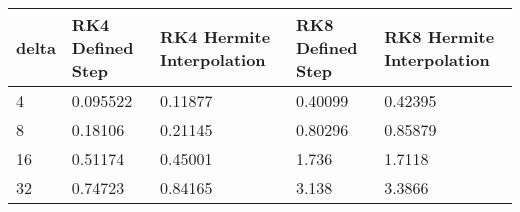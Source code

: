 \begin{tabular}{lllll}
delta & RK4 Defined Step & RK4 Hermite Interpolation & RK8 Defined Step & RK8 Hermite Interpolation \\ 
\hline 
4 & 0.095522 & 0.11877 & 0.40099 & 0.42395 \\ 
8 & 0.18106 & 0.21145 & 0.80296 & 0.85879 \\ 
16 & 0.51174 & 0.45001 & 1.736 & 1.7118 \\ 
32 & 0.74723 & 0.84165 & 3.138 & 3.3866 \\ 
\hline 
\end{tabular}